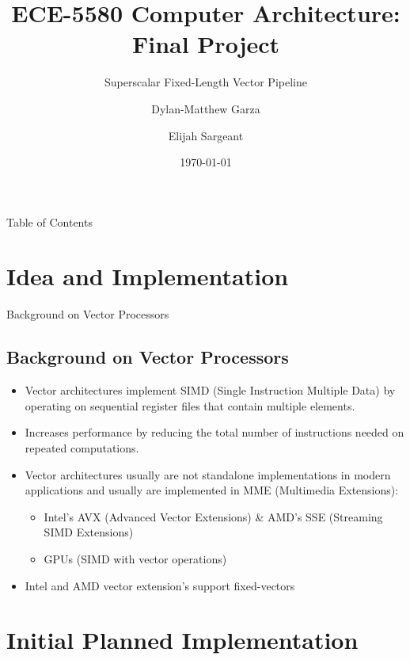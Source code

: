 \documentclass{beamer}
\title[Superscalar Fixed-Length Vector Processor]{ECE-5580 Computer Architecture: Final Project} %
\subtitle{Superscalar Fixed-Length Vector Pipeline} %
\author[Garza et al.]{Dylan-Matthew Garza \and Elijah Sargeant} %
\institute[Western Michigan University]{ %
  Department of Electrical and Computer Engineering \\
  Western Michigan University 
}
\date{\today} %
\begin{document}
\begin{frame}
  \titlepage %
\end{frame}

\begin{frame}{Table of Contents}
  \tableofcontents %
\end{frame}

\section{Idea and Implementation}
\begin{frame}{Background on Vector Processors}
    \subsection{Background on Vector Processors}
    \begin{itemize}
        \item Vector architectures implement SIMD
            (Single Instruction Multiple Data) by operating 
            on sequential register files that contain multiple elements.
        \item Increases performance by reducing the total number of instructions
            needed on repeated computations.
        \item Vector architectures usually are not standalone implementations in 
            modern applications and usually are implemented in MME 
            (Multimedia Extensions):
            \begin{itemize}
                \item Intel's AVX (Advanced Vector Extensions) \& 
                    AMD's SSE (Streaming SIMD Extensions)
                \item GPUs (SIMD with vector operations)
            \end{itemize}
        \item Intel and AMD vector extension's support fixed-vectors
    \end{itemize}
\end{frame}

\section{Initial Planned Implementation}
\end{document}
